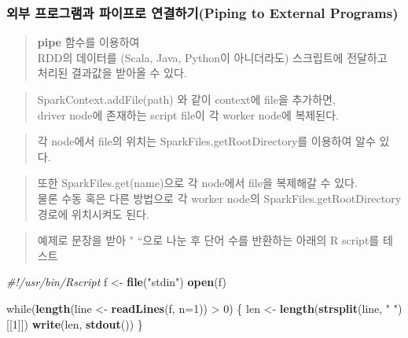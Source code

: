 \documentclass[11pt]{article}
\newenvironment{Shaded}{}{}
\newcommand{\KeywordTok}[1]{\textcolor[rgb]{0.00,0.44,0.13}{\textbf{{#1}}}}
\newcommand{\DataTypeTok}[1]{\textcolor[rgb]{0.56,0.13,0.00}{{#1}}}
\newcommand{\DecValTok}[1]{\textcolor[rgb]{0.25,0.63,0.44}{{#1}}}
\newcommand{\StringTok}[1]{\textcolor[rgb]{0.25,0.44,0.63}{{#1}}}
\newcommand{\CommentTok}[1]{\textcolor[rgb]{0.38,0.63,0.69}{\textit{{#1}}}}
\newcommand{\NormalTok}[1]{{#1}}
\begin{document}
    \subsubsection{외부 프로그램과 파이프로 연결하기(Piping to External
Programs)}\label{uxc678uxbd80-uxd504uxb85cuxadf8uxb7a8uxacfc-uxd30cuxc774uxd504uxb85c-uxc5f0uxacb0uxd558uxae30piping-to-external-programs}

    \begin{quote}
\textbf{pipe} 함수를 이용하여\\RDD의 데이터를 (Scala, Java, Python이
아니더라도) 스크립트에 전달하고\\처리된 결과값을 받아올 수 있다.
\end{quote}

\begin{quote}
SparkContext.addFile(path) 와 같이 context에 file을 추가하면,\\driver
node에 존재하는 script file이 각 worker node에 복제된다.
\end{quote}

\begin{quote}
각 node에서 file의 위치는 SparkFiles.getRootDirectory를 이용하여 알수
있다.
\end{quote}

\begin{quote}
또한 SparkFiles.get(name)으로 각 node에서 file을 복제해갈 수 있다.\\물론
수동 혹은 다른 방법으로 각 worker node의 SparkFiles.getRootDirectory
경로에 위치시켜도 된다.
\end{quote}

    \begin{quote}
예제로 문장을 받아 " ``으로 나눈 후 단어 수를 반환하는 아래의 R script를
테스트
\end{quote}

    \begin{Shaded}
\begin{Highlighting}[]
\CommentTok{#!/usr/bin/Rscript}
\NormalTok{f <-}\StringTok{ }\KeywordTok{file}\NormalTok{(}\StringTok{"stdin"}\NormalTok{)}
\KeywordTok{open}\NormalTok{(f)}

\NormalTok{while(}\KeywordTok{length}\NormalTok{(line <-}\StringTok{ }\KeywordTok{readLines}\NormalTok{(f, }\DataTypeTok{n=}\DecValTok{1}\NormalTok{)) >}\StringTok{ }\DecValTok{0}\NormalTok{) \{}
  \NormalTok{len <-}\StringTok{ }\KeywordTok{length}\NormalTok{(}\KeywordTok{strsplit}\NormalTok{(line, }\StringTok{" "}\NormalTok{)[[}\DecValTok{1}\NormalTok{]])}
  \KeywordTok{write}\NormalTok{(len, }\KeywordTok{stdout}\NormalTok{())}
\NormalTok{\}}
\end{Highlighting}
\end{Shaded}
\end{document}
